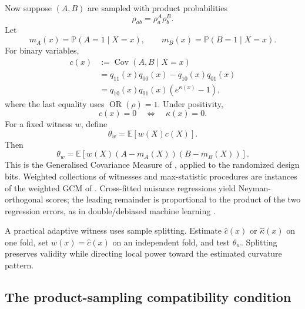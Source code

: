 \documentclass[11pt]{article}
\newcommand{\E}{\mathbb{E}}
\newcommand{\Pp}{\mathbb{P}}
\newcommand{\Cov}{\operatorname{Cov}}
\newcommand{\OR}{\operatorname{OR}}
\begin{document}
Now suppose \((A,B)\) are sampled with product probabilities
\begin{equation}
\rho_{ab}=\rho^A_a\rho^B_b.
\label{eq:product-sampling}
\end{equation}
Let
\begin{equation}
m_A(x)=\Pp(A=1\mid X=x),
\qquad
m_B(x)=\Pp(B=1\mid X=x).
\end{equation}
For binary variables,
\begin{align}
c(x)
&:=\Cov(A,B\mid X=x)\\
&=q_{11}(x)q_{00}(x)-q_{10}(x)q_{01}(x)\\
&=q_{10}(x)q_{01}(x)(e^{\kappa(x)}-1),
\label{eq:cov-odds-duality}
\end{align}
where the last equality uses \(\OR(\rho)=1\).  Under positivity,
\begin{equation}
c(x)=0\quad\Longleftrightarrow\quad\kappa(x)=0.
\end{equation}
For a fixed witness \(w\), define
\begin{equation}
\theta_w=\E[w(X)c(X)].
\end{equation}
Then
\begin{equation}
\boxed{
\theta_w
=
\E\left[w(X)(A-m_A(X))(B-m_B(X))\right].
}
\label{eq:gcm-moment}
\end{equation}
This is the Generalised Covariance Measure of \citet{shah2020gcm}, applied to the randomized design bits.  Weighted collections of witnesses and max-statistic procedures are instances of the weighted GCM of \citet{scheidegger2022wgcm}.  Cross-fitted nuisance regressions yield Neyman-orthogonal scores; the leading remainder is proportional to the product of the two regression errors, as in double/debiased machine learning \citep{chernozhukov2018dml}.

A practical adaptive witness uses sample splitting.  Estimate \(\widehat c(x)\) or \(\widehat\kappa(x)\) on one fold, set \(w(x)=\widehat c(x)\) on an independent fold, and test \(\theta_w\).  Splitting preserves validity while directing local power toward the estimated curvature pattern.

\subsection{The product-sampling compatibility condition}
\end{document}
